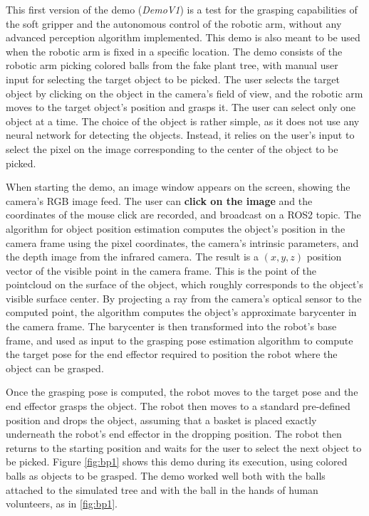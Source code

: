 This first version of the demo (\textit{DemoV1}) is a test for the grasping capabilities of the soft gripper and
the autonomous control of the robotic arm, without any advanced perception algorithm implemented. 
This demo is also meant to be used when the robotic arm is fixed in a specific location. The demo consists of
the robotic arm picking colored balls from the fake plant tree, with manual user input for selecting the target
object to be picked. The user selects the target object by clicking on the object in the camera's field of view,
and the robotic arm moves to the target object's position and grasps it. The user can select only one object at 
a time. The choice of the object is rather simple, as it does not use any neural network for detecting
the objects. Instead, it relies on the user's input to select the pixel on the image corresponding
to the center of the object to be picked.

When starting the demo, an image window appears on the screen, showing the camera's RGB image feed.
The user can \textbf{click on the image} and the coordinates of the mouse click are recorded, and broadcast on a ROS2
topic. The algorithm for object position estimation computes the object's position in the camera frame
using the pixel coordinates, the camera's intrinsic parameters, and the depth image from the infrared camera.
The result is a $(x, y, z)$ position vector of the visible point in the camera frame. 
This is the point of the pointcloud on the surface of the object, which roughly corresponds to the 
object's visible surface center. By projecting a ray from the camera's optical sensor to the computed point,
the algorithm computes the object's approximate barycenter in the camera frame. The barycenter is then transformed
into the robot's base frame, and used as input to the grasping pose estimation algorithm to compute the target pose
for the end effector required to position the robot where the object can be grasped.

Once the grasping pose is computed, the robot moves to the target pose and the end effector grasps the object.
The robot then moves to a standard pre-defined position and drops the object, assuming that a basket
is placed exactly underneath the robot's end effector in the dropping position. The robot then returns to the
starting position and waits for the user to select the next object to be picked. Figure \ref{fig:bp1}
shows this demo during its execution, using colored balls as objects to be grasped. The demo worked well
both with the balls attached to the simulated tree and with the ball in the hands of human volunteers, as
in \ref{fig:bp1}.

